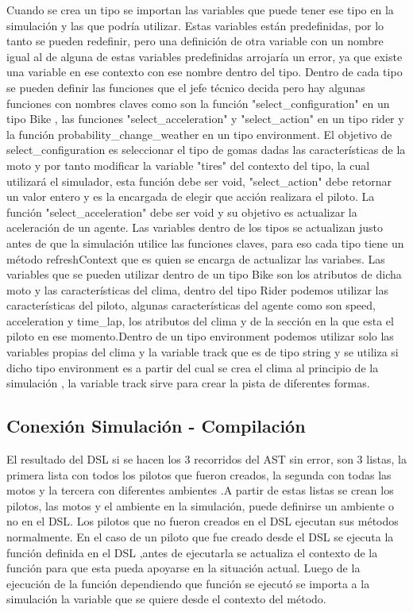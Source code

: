 \documentclass[12pt, letterpaper,spanish]{article}
\theoremstyle{definition}
\theoremstyle{remark}
\begin{document}
        Cuando se crea un tipo se importan las variables que puede tener ese tipo en la simulación y las que podría utilizar. Estas variables están predefinidas, por lo tanto se pueden redefinir, pero una definición de otra variable con un nombre igual al de alguna de estas variables predefinidas arrojaría un error, ya que existe una variable en ese contexto con ese nombre dentro del tipo. Dentro de cada tipo se pueden definir las funciones que el jefe técnico decida pero hay algunas funciones con nombres claves como son la función "select\_configuration" en un tipo Bike , las funciones "select\_acceleration" y "select\_action" en un tipo rider y la función probability\_change\_weather en un tipo environment. El objetivo de select\_configuration es seleccionar el tipo de gomas dadas las características de la moto y por tanto modificar la variable "tires" del contexto del tipo, la cual utilizará el simulador, esta función debe ser void, "select\_action" debe retornar un valor entero y es la encargada de elegir que acción realizara el piloto. La función "select\_acceleration" debe ser void y su objetivo es actualizar la aceleración de un agente. Las variables dentro de los tipos se actualizan justo antes de que la simulación utilice las funciones claves, para eso cada tipo tiene un método refreshContext que es quien se encarga de actualizar las variabes. Las variables que se pueden utilizar dentro de un tipo Bike son los atributos de dicha moto y las características del clima, dentro del tipo Rider podemos utilizar las características del piloto, algunas características del agente como son speed, acceleration
        y time\_lap, los atributos del clima y de la sección en la que esta el piloto en ese momento.Dentro de un tipo environment podemos utilizar solo las variables propias del clima y la variable track que es de tipo string y se utiliza si dicho tipo environment es a partir del cual se crea el clima al principio de la simulación , la variable track sirve para crear la pista de diferentes formas.      


	\subsection{Conexión Simulación - Compilación}
		El resultado del DSL si se hacen los 3 recorridos del AST sin error, son 3 listas, la primera lista con todos los pilotos que fueron
        creados, la segunda con todas las motos y la tercera con diferentes ambientes .A partir de estas listas se crean los pilotos, las motos y el ambiente en la simulación, puede definirse un ambiente o no en el DSL. 
        Los pilotos que no fueron creados en el DSL ejecutan sus métodos normalmente. En el caso de un piloto que fue creado desde el DSL se ejecuta la función definida en el DSL ,antes de ejecutarla se actualiza el contexto de la función para que esta pueda apoyarse en la situación actual. Luego de la ejecución de la función dependiendo que función se ejecutó se importa a la simulación la variable que se quiere desde el contexto del método.
	
\pagebreak


\end{document}
